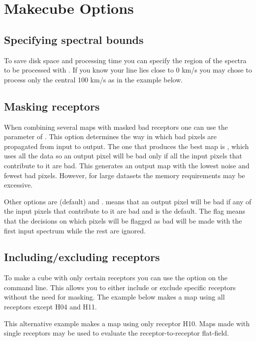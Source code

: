 \documentclass[11pt,oneside,chapters]{starlink}
\begin{document}
\section{Makecube Options}

\subsection{Specifying spectral bounds}

To save disk space and processing time you can specify the region of
the spectra to be processed with . If you know your
line lies close to 0 km/s you may chose to process only the central
100 km/s as in the example below.
\begin{terminalv}
\end{terminalv}

\subsection{Masking receptors}

When combining several maps with masked bad receptors one can use the
 parameter of \makecube. This option determines the way
in which bad pixels are propagated from input to output. The one that
produces the best map is , which uses all the data
so an output pixel will be bad only if all the input pixels that
contribute to it are bad. This generates an output map with the lowest
noise and fewest bad pixels. However, for large datasets the memory
requirements may be excessive.

Other options are  (default) and
.  means that an output pixel will be
bad if any of the input pixels that contribute to it are bad and is
the default.  The flag  means that the decisions on which pixels
will be flagged as bad will be made with the first input spectrum
while the rest are ignored.

\subsection{Including/excluding receptors}

To make a cube with only certain receptors you can use the
 option on the command line. This allows you to
either include or exclude specific receptors without the need for
masking. The example below makes a map using all receptors except H04
and H11.
\begin{terminalv}
\end{terminalv}
This alternative example makes a map using only receptor H10. Maps
made with single receptors may be used to evaluate the
receptor-to-receptor flat-field.
\begin{terminalv}
\end{terminalv}
\end{document}
